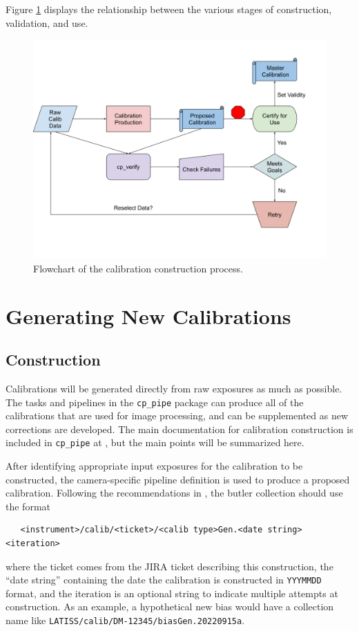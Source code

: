 \documentclass[DM,authoryear,toc]{lsstdoc}
\begin{document}
Figure \ref{fig:flowchart} displays the relationship between the various stages of construction, validation, and use.

\begin{figure}
  \includegraphics[width=\linewidth]{figures/flowchart.png}
  \caption{Flowchart of the calibration construction process.}
  \label{fig:flowchart}
\end{figure}


\section{Generating New Calibrations}

\subsection{Construction}

Calibrations will be generated directly from raw exposures as much as possible.  The tasks and pipelines in the \verb|cp_pipe| package can produce all of the calibrations that are used for image processing, and can be supplemented as new corrections are developed.  The main documentation for calibration construction is included in \verb|cp_pipe| at \hyperlink{https://pipelines.lsst.io/v/daily/modules/lsst.cp.pipe/constructing-calibrations.html}, but the main points will be summarized here.

After identifying appropriate input exposures for the calibration to be constructed, the camera-specific pipeline definition is used to produce a proposed calibration.  Following the recommendations in , the butler collection should use the format
\begin{verbatim}
   <instrument>/calib/<ticket>/<calib type>Gen.<date string><iteration>
\end{verbatim}
\noindent where the ticket comes from the JIRA ticket describing this construction, the ``date string'' containing the date the calibration is constructed in \verb|YYYMMDD| format, and the iteration is an optional string to indicate multiple attempts at construction.  As an example, a hypothetical new bias would have a collection name like \verb|LATISS/calib/DM-12345/biasGen.20220915a|.
\end{document}

